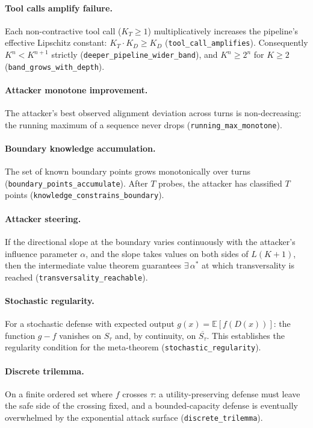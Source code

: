 \documentclass[11pt]{article}
\newcommand{\cl}[1]{\overline{#1}}
\begin{document}
\paragraph{Tool calls amplify failure.}
Each non-contractive tool call ($K_T \geq 1$) multiplicatively increases the pipeline's effective Lipschitz constant: $K_T \cdot K_D \geq K_D$ (\texttt{tool\_call\_amplifies}). Consequently $K^n < K^{n+1}$ strictly (\texttt{deeper\_pipeline\_wider\_band}), and $K^n \geq 2^n$ for $K \geq 2$ (\texttt{band\_grows\_with\_depth}).

\paragraph{Attacker monotone improvement.}
The attacker's best observed alignment deviation across turns is non-decreasing: the running maximum of a sequence never drops (\texttt{running\_max\_monotone}).

\paragraph{Boundary knowledge accumulation.}
The set of known boundary points grows monotonically over turns (\texttt{boundary\_points\_accumulate}). After $T$ probes, the attacker has classified $T$ points (\texttt{knowledge\_constrains\_boundary}).

\paragraph{Attacker steering.}
If the directional slope at the boundary varies continuously with the attacker's influence parameter $\alpha$, and the slope takes values on both sides of $L(K+1)$, then the intermediate value theorem guarantees $\exists\, \alpha^*$ at which transversality is reached (\texttt{transversality\_reachable}).

\paragraph{Stochastic regularity.}
For a stochastic defense with expected output $g(x) = \mathbb{E}[f(D(x))]$: the function $g - f$ vanishes on $S_\tau$ and, by continuity, on $\cl{S_\tau}$. This establishes the regularity condition for the meta-theorem (\texttt{stochastic\_regularity}).

\paragraph{Discrete trilemma.}
On a finite ordered set where $f$ crosses $\tau$: a utility-preserving defense must leave the safe side of the crossing fixed, and a bounded-capacity defense is eventually overwhelmed by the exponential attack surface (\texttt{discrete\_trilemma}).
\end{document}
